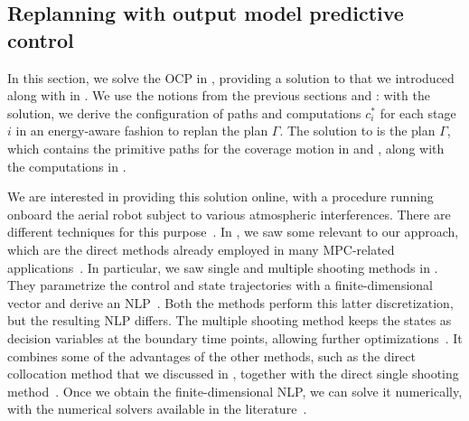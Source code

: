 \subsection{Replanning with output model predictive control}
\label{sec:opt-cont-gener}

In this section, we solve the OCP in , providing a solution to  that we introduced along with  in . We use the notions from the previous sections and : with the solution, we derive the configuration of paths and computations $c_i^*$ for each stage $i$ in an energy-aware fashion to replan the plan $\Gamma$. The solution to  is the plan $\Gamma$, which contains the primitive paths for the coverage motion in  and , along with the computations in . 

We are interested in providing this solution online, with a procedure running onboard the aerial robot subject to various atmospheric interferences. There are different techniques for this purpose~\citep{grune2017nonlinear,rawlings2017model}. In , we saw some relevant to our approach, which are the direct methods already employed in many MPC-related applications~\citep{rawlings2017model}. In particular, we saw single and multiple shooting methods in . They parametrize the control and state trajectories with a finite-dimensional vector and derive an NLP~\citep{rawlings2017model}. Both the methods perform this latter discretization, but the resulting NLP differs. The multiple shooting method keeps the states as decision variables at the boundary time points, allowing further optimizations~\citep{rawlings2017model}. It combines some of the advantages of the other methods, such as the direct collocation method that we discussed in , together with the direct single shooting method~\citep{diehl2006fast,grune2017nonlinear}. Once we obtain the finite-dimensional NLP, we can solve it numerically, with the numerical solvers available in the literature~\citep{diehl2006fast,grune2017nonlinear,nocedal2006numerical}. 

